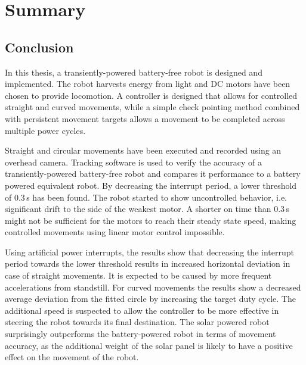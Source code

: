 \chapter{Summary}
\label{chp:summary}


\section{Conclusion}
\label{sec:conclusion}

In this thesis, a transiently-powered battery-free robot is designed and implemented.
The robot harvests energy from light and DC motors have been chosen to provide locomotion.
A controller is designed that allows for controlled straight and curved movements, while a simple check pointing method combined with persistent movement targets allows a movement to be completed across multiple power cycles.

Straight and circular movements have been executed and recorded using an overhead camera.
Tracking software is used to verify the accuracy of a transiently-powered battery-free robot and compares it performance to a battery powered equivalent robot.
By decreasing the interrupt period, a lower threshold of 0.3\,s has been found.
The robot started to show uncontrolled behavior, i.e. significant drift to the side of the weakest motor.
A shorter on time than 0.3\,s might not be sufficient for the motors to reach their steady state speed, making controlled movements using linear motor control impossible.

Using artificial power interrupts, the results show that decreasing the interrupt period towards the lower threshold results in increased horizontal deviation in case of straight movements.
It is expected to be caused by more frequent accelerations from standstill.
For curved movements the results show a decreased average deviation from the fitted circle by increasing the target duty cycle.
The additional speed is suspected to allow the controller to be more effective in steering the robot towards its final destination.
The solar powered robot surprisingly outperforms the battery-powered robot in terms of movement accuracy, as the additional weight of the solar panel is likely to have a positive effect on the movement of the robot.


